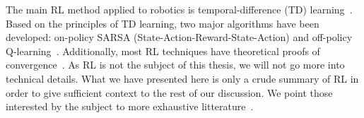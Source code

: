 






  The main RL method applied to robotics is temporal-difference (TD) learning~\parencite{Sutton1988, Bradtke1996}. Based on the principles of TD learning, two major algorithms have been developed: on-policy SARSA (State-Action-Reward-State-Action) and off-policy Q-learning~\parencite{Watkins1989}. Additionally, most RL techniques have theoretical proofs of convergence~\parencite{Panait2005}. As RL is not the subject of this thesis, we will not go more into technical details. What we have presented here is only a crude summary of RL in order to give sufficient context to the rest of our discussion. We point those interested by the subject to more exhaustive litterature~\parencite{Sutton1998, Deisenroth2011}.



